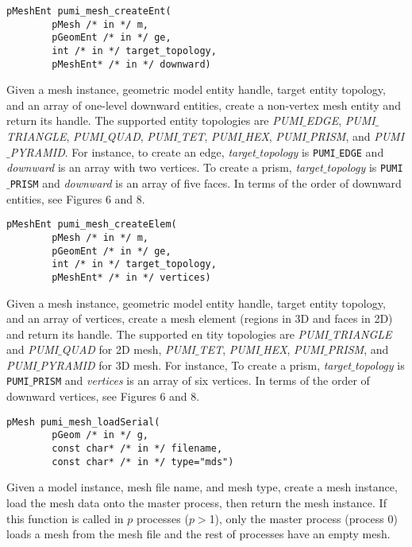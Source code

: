 \begin{verbatim}
pMeshEnt pumi_mesh_createEnt(
        pMesh /* in */ m, 
        pGeomEnt /* in */ ge,
        int /* in */ target_topology, 
        pMeshEnt* /* in */ downward)
\end{verbatim}\vspace{-.5cm}\hspace{1cm}
Given a mesh instance, geometric model entity handle, target entity topology, and an array of one-level downward entities, create a non-vertex mesh entity and return its handle. The supported entity topologies are \emph{PUMI$\_$EDGE}, \emph{PUMI$\_$TRIANGLE}, \emph{PUMI$\_$QUAD}, \emph{PUMI$\_$TET}, \emph{PUMI$\_$HEX}, \emph{PUMI$\_$PRISM}, and \emph{PUMI$\_$PYRAMID}. For instance, to create an edge, \emph{target$\_$topology} is \texttt{PUMI$\_$EDGE} and \emph{downward} is an array with two vertices. 
To create a prism, \emph{target$\_$topology} is \texttt{PUMI$\_$PRISM} and \emph{downward} is an array of five faces. In terms of the order of downward entities, see Figures 6 and 8. 

\begin{verbatim}
pMeshEnt pumi_mesh_createElem(
        pMesh /* in */ m,
        pGeomEnt /* in */ ge,
        int /* in */ target_topology,
        pMeshEnt* /* in */ vertices)
\end{verbatim}\vspace{-.5cm}\hspace{1cm}
Given a mesh instance, geometric model entity handle, target entity topology, and an array of vertices, create a mesh element (regions in 3D and faces in 2D) and return its handle. The supported en
tity topologies are \emph{PUMI$\_$TRIANGLE} and \emph{PUMI$\_$QUAD} for 2D mesh, \emph{PUMI$\_$TET}, \emph{PUMI$\_$HEX}, \emph{PUMI$\_$PRISM}, and \emph{PUMI$\_$PYRAMID} for 3D mesh. For instance,
To create a prism, \emph{target$\_$topology} is \texttt{PUMI$\_$PRISM} and \emph{vertices} is an 
array of six vertices. In terms of the order of downward vertices, see Figures 6 and 8.

\begin{verbatim}
pMesh pumi_mesh_loadSerial(
        pGeom /* in */ g, 
        const char* /* in */ filename, 
        const char* /* in */ type="mds")
\end{verbatim}\vspace{-.5cm}\hspace{1cm}   	
	Given a model instance, mesh file name, and mesh type, create a mesh instance, load the mesh data onto the master process, then return the mesh instance. If this function is called in $p$ processes ($p$$>$1), only the master process (process $0$) loads a mesh from the mesh file and the rest of processes have an empty mesh.

